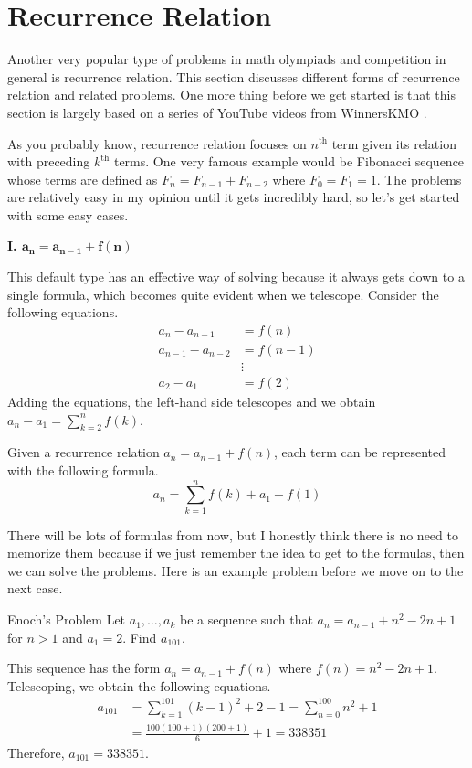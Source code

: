 \documentclass[../../../main.tex]{subfiles}
\begin{document}
\section{Recurrence Relation}

Another very popular type of problems in math olympiads and
competition in general is recurrence relation. This section discusses
different forms of recurrence relation and related problems. One more
thing before we get started is that this section is largely based on
a series of YouTube videos from WinnersKMO \cite{MATH01-5}.

As you probably know, recurrence relation focuses on $n^\text{th}$
term given its relation with preceding $k^\text{th}$ terms.
One very famous example would be Fibonacci sequence whose terms
are defined as $F_n = F_{n-1} + F_{n-2}$ where $F_0 = F_1 = 1$.
The problems are relatively easy in my opinion until it gets
incredibly hard, so let's get started with some easy cases.

{\Large\textcolor{BrickRed}
{\textbf{I. $\mathbf{a_n = a_{n-1} + f(n)}$}}}

This default type has an effective way of solving because it always
gets down to a single formula, which becomes quite evident when we
telescope. Consider the following equations.
\begin{align*}
    a_n - a_{n-1} &= f(n) \\
    a_{n-1} - a_{n-2} &= f(n-1) \\
    &\vdots \\
    a_2 - a_1 &= f(2)
\end{align*}
Adding the equations, the left-hand side telescopes and we obtain
$a_n - a_1 = \sum_{k=2}^n f(k)$.

\begin{important}
Given a recurrence relation $a_n = a_{n-1} + f(n)$, each term can be
represented with the following formula.
\[
a_n = \sum_{k=1}^n f(k) + a_1 - f(1)
\]
\end{important}

There will be lots of formulas from now, but I honestly think there
is no need to memorize them because if we just remember the idea to
get to the formulas, then we can solve the problems. Here is an
example problem before we move on to the next case.

\begin{problem}{Enoch's Problem}{}
Let $a_1, \ldots, a_k$ be a sequence such that $a_n = a_{n-1} +
n^2 - 2n + 1$ for $n > 1$ and $a_1 = 2$. Find $a_{101}$.
\end{problem}
\begin{solution}
This sequence has the form $a_n = a_{n-1} + f(n)$ where $f(n) = n^2
- 2n + 1$. Telescoping, we obtain the following equations.
\begin{align*}
    a_{101}
    &= \sum_{k=1}^{101} (k-1)^2 + 2 - 1
    = \sum_{n=0}^{100} n^2 + 1 \\
    &= \frac{100(100 + 1)(200 + 1)}{6} + 1
    = 338351
\end{align*}
Therefore, $a_{101} = 338351$.
\end{solution}
\end{document}
